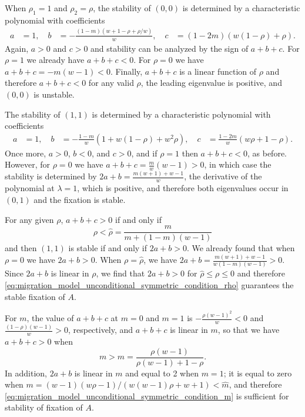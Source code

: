 \documentclass[11pt]{extarticle}
\begin{document}
When $\rho_1=1$ and $\rho_2=\rho$, the stability of $(0,0)$ is determined by a characteristic polynomial with coefficients
\begin{equation}
\begin{aligned}
a &= 1, \quad
b &= -\frac{(1-m)(w+1-\rho+\rho/w)}{w}, \quad
c &=  (1-2m)(w(1-\rho)+\rho).
\end{aligned}
\end{equation}
Again, $a>0$ and $c>0$   and stability can be analyzed by the sign of $a+b+c$.
For $\rho=1$ we already have $a+b+c<0$.
For $\rho=0$ we have $a+b+c=-m(w-1)<0$.
Finally, $a+b+c$ is a linear function of $\rho$ and therefore $a+b+c<0$ for any valid $\rho$, the leading eigenvalue is positive, and $(0,0)$ is unstable.

The stability of $(1,1)$ is determined by a characteristic polynomial  with coefficients
\begin{equation}
\begin{aligned}
a &= 1, \quad
b &= -\frac{1-m}{w}(1 + w(1-\rho) +w^2 \rho), \quad
c &= \frac{1-2m}{w} (w\rho+1-\rho).
\end{aligned}
\end{equation}
Once more, $a>0$, $b<0$, and $c>0$, and if $\rho=1$ then $a+b+c<0$, as before.
However, for $\rho=0$ we have $a+b+c = \frac{m}{w}(w-1)>0$, in which case the stability is determined by $2a+b=\frac{m(w+1)+w-1}{w}$, the derivative of the polynomial at $\lambda=1$, which is positive, and therefore both eigenvalues occur in $(0,1)$ and the fixation is stable.

For any given $\rho$, $a+b+c>0$ if and only if
\begin{equation}
\rho < \hat \rho = \frac{m}{m+(1-m)(w-1)}
\end{equation}
and then $(1,1)$ is stable if and only if $2a+b>0$.
We already found that when $\rho=0$ we have $2a+b>0$.
When $\rho = \hat \rho$, we have $2a+b=\frac{m(w+1)+w-1}{w(1-m)(w-1)}>0$.
Since $2a+b$ is linear in $\rho$, we find that $2a+b>0$ for $\hat \rho \le \rho \le 0$ and therefore \eqref{eq:migration_model_unconditional_symmetric_condition_rho} guarantees the stable fixation of $A$.

For $m$, the value of $a+b+c$ at $m=0$ and $m=1$ is $-\frac{\rho(w-1)^2}{w}<0$ and $\frac{(1-\rho)(w-1)}{w}>0$, respectively, and $a+b+c$ is linear in $m$, so that we have $a+b+c>0$ when 
\begin{equation}
m > \hat m = \frac{\rho (w-1)}{\rho (w-1) +1-\rho}.
\end{equation}
In addition, $2a+b$ is linear in $m$ and equal to 2 when $m=1$; it is equal to zero when $m=(w-1)(w\rho-1)/(w(w-1)\rho+w+1) < \hat m$, and therefore \eqref{eq:migration_model_unconditional_symmetric_condition_m} is sufficient for stability of fixation of $A$.
\end{document}
